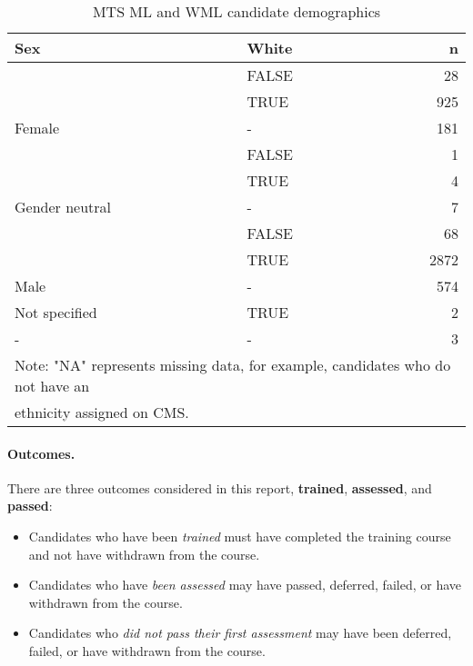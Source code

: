 \documentclass[
  12pt,
  a4paper,
]{book}
\providecommand{\tightlist}{%
  \setlength{\itemsep}{0pt}\setlength{\parskip}{0pt}}
\begin{document}
\begin{table}

\caption{\label{tab:mts-candidate-demographics}MTS ML and WML candidate demographics}
\centering
\begin{tabular}[t]{llr}
\toprule
Sex & White & n\\
\midrule
 & FALSE & 28\\
\cmidrule{2-3}
 & TRUE & 925\\
\cmidrule{2-3}
\multirow[t]{-3}{*}{\raggedright\arraybackslash Female} & - & 181\\
\cmidrule{1-3}
 & FALSE & 1\\
\cmidrule{2-3}
 & TRUE & 4\\
\cmidrule{2-3}
\multirow[t]{-3}{*}{\raggedright\arraybackslash Gender neutral} & - & 7\\
\cmidrule{1-3}
 & FALSE & 68\\
\cmidrule{2-3}
 & TRUE & 2872\\
\cmidrule{2-3}
\multirow[t]{-3}{*}{\raggedright\arraybackslash Male} & - & 574\\
\cmidrule{1-3}
Not specified & TRUE & 2\\
\cmidrule{1-3}
- & - & 3\\
\bottomrule
\multicolumn{3}{l}{\textsuperscript{} Note: "NA" represents missing data, for example, candidates who do not have an}\\
\multicolumn{3}{l}{ethnicity assigned on CMS.}\\
\end{tabular}
\end{table}

\hypertarget{mts-part-a-outcomes}{%
\paragraph{Outcomes.}\label{mts-part-a-outcomes}}

There are three outcomes considered in this report, \textbf{trained}, \textbf{assessed}, and \textbf{passed}:

\begin{itemize}
\tightlist
\item
  Candidates who have been \emph{trained} must have completed the training course and not have withdrawn from the course.
\item
  Candidates who have \emph{been assessed} may have passed, deferred, failed, or have withdrawn from the course.
\item
  Candidates who \emph{did not pass their first assessment} may have been deferred, failed, or have withdrawn from the course.
\end{itemize}
\end{document}
